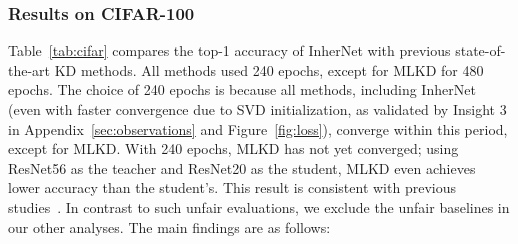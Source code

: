 \documentclass{article} %
\begin{document}
\subsubsection{Results on CIFAR-100}
\label{sec:result_cifar}
Table~\ref{tab:cifar} compares the top-1 accuracy of InherNet with previous state-of-the-art KD methods.
All methods used 240 epochs, except for MLKD for 480 epochs. The choice of 240 epochs is because all methods, including InherNet (even with faster convergence due to SVD initialization, as validated by Insight 3 in Appendix~\ref{sec:observations} and Figure~\ref{fig:loss}), converge within this period, except for MLKD. With 240 epochs, MLKD has not yet converged; using ResNet56 as the teacher and ResNet20 as the student, MLKD even achieves lower accuracy than the student's. This result is consistent with previous studies~\cite{jin2023multi, sun2024logit}. In contrast to such unfair evaluations, we exclude the unfair baselines in our other analyses.
The main findings are as follows:
\end{document}
